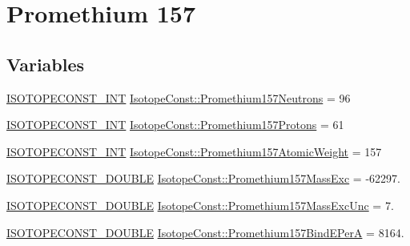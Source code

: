 \hypertarget{group___isotope_const-_promethium-_pm157}{}\section{Promethium 157}
\label{group___isotope_const-_promethium-_pm157}
\subsection*{Variables}
\begin{DoxyCompactItemize}
\item 
\mbox{\hyperlink{group___isotope_const-_macros_ga5f18360b3e99483a35c32d789e62621c}{I\+S\+O\+T\+O\+P\+E\+C\+O\+N\+S\+T\+\_\+\+I\+NT}} \mbox{\hyperlink{group___isotope_const-_promethium-_pm157_ga621ee6015652758caa7d812cf97fc341}{Isotope\+Const\+::\+Promethium157\+Neutrons}} = 96
\item 
\mbox{\hyperlink{group___isotope_const-_macros_ga5f18360b3e99483a35c32d789e62621c}{I\+S\+O\+T\+O\+P\+E\+C\+O\+N\+S\+T\+\_\+\+I\+NT}} \mbox{\hyperlink{group___isotope_const-_promethium-_pm157_ga2dae0798b9bf8f1e6bf0e11c0b686470}{Isotope\+Const\+::\+Promethium157\+Protons}} = 61
\item 
\mbox{\hyperlink{group___isotope_const-_macros_ga5f18360b3e99483a35c32d789e62621c}{I\+S\+O\+T\+O\+P\+E\+C\+O\+N\+S\+T\+\_\+\+I\+NT}} \mbox{\hyperlink{group___isotope_const-_promethium-_pm157_ga052ed29dc94e5a7ef05a863dc4a02255}{Isotope\+Const\+::\+Promethium157\+Atomic\+Weight}} = 157
\item 
\mbox{\hyperlink{group___isotope_const-_macros_ga8f45a7272ce02c0b4c65c44636ed719a}{I\+S\+O\+T\+O\+P\+E\+C\+O\+N\+S\+T\+\_\+\+D\+O\+U\+B\+LE}} \mbox{\hyperlink{group___isotope_const-_promethium-_pm157_ga393fd8b1b4581285fe84704d13272f08}{Isotope\+Const\+::\+Promethium157\+Mass\+Exc}} = -\/62297.
\item 
\mbox{\hyperlink{group___isotope_const-_macros_ga8f45a7272ce02c0b4c65c44636ed719a}{I\+S\+O\+T\+O\+P\+E\+C\+O\+N\+S\+T\+\_\+\+D\+O\+U\+B\+LE}} \mbox{\hyperlink{group___isotope_const-_promethium-_pm157_ga6379c979934b3198632088f424d154f4}{Isotope\+Const\+::\+Promethium157\+Mass\+Exc\+Unc}} = 7.
\item 
\mbox{\hyperlink{group___isotope_const-_macros_ga8f45a7272ce02c0b4c65c44636ed719a}{I\+S\+O\+T\+O\+P\+E\+C\+O\+N\+S\+T\+\_\+\+D\+O\+U\+B\+LE}} \mbox{\hyperlink{group___isotope_const-_promethium-_pm157_gac3abd1e41be989bbf688b061be82f615}{Isotope\+Const\+::\+Promethium157\+Bind\+E\+PerA}} = 8164.

\end{DoxyCompactItemize}
